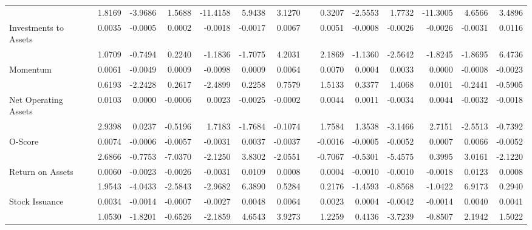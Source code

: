 \begin{sidewaystable}[htbp]
{\begin{tabular}{lrrrrrrrrrrrrr}
& 1.8169 & -3.9686 & 1.5688 & -11.4158 & 5.9438 & 3.1270 &       & 0.3207 & -2.5553 & 1.7732 & -11.3005 & 4.6566 & 3.4896 \\
Investments to Assets & 0.0035 & -0.0005 & 0.0002 & -0.0018 & -0.0017 & 0.0067 &       & 0.0051 & -0.0008 & -0.0026 & -0.0026 & -0.0031 & 0.0116 \\
& 1.0709 & -0.7494 & 0.2240 & -1.1836 & -1.7075 & 4.2031 &       & 2.1869 & -1.1360 & -2.5642 & -1.8245 & -1.8695 & 6.4736 \\
Momentum & 0.0061 & -0.0049 & 0.0009 & -0.0098 & 0.0009 & 0.0064 &       & 0.0070 & 0.0004 & 0.0033 & 0.0000 & -0.0008 & -0.0023 \\
& 0.6193 & -2.2428 & 0.2617 & -2.4899 & 0.2258 & 0.7579 &       & 1.5133 & 0.3377 & 1.4068 & 0.0101 & -0.2441 & -0.5905 \\
Net Operating Assets & 0.0103 & 0.0000 & -0.0006 & 0.0023 & -0.0025 & -0.0002 &       & 0.0044 & 0.0011 & -0.0034 & 0.0044 & -0.0032 & -0.0018 \\
& 2.9398 & 0.0237 & -0.5196 & 1.7183 & -1.7684 & -0.1074 &       & 1.7584 & 1.3538 & -3.1466 & 2.7151 & -2.5513 & -0.7392 \\
O-Score & 0.0074 & -0.0006 & -0.0057 & -0.0031 & 0.0037 & -0.0037 &       & -0.0016 & -0.0005 & -0.0052 & 0.0007 & 0.0066 & -0.0052 \\
& 2.6866 & -0.7753 & -7.0370 & -2.1250 & 3.8302 & -2.0551 &       & -0.7067 & -0.5301 & -5.4575 & 0.3995 & 3.0161 & -2.1220 \\
Return on Assets & 0.0060 & -0.0023 & -0.0026 & -0.0031 & 0.0109 & 0.0008 &       & 0.0004 & -0.0010 & -0.0010 & -0.0018 & 0.0123 & 0.0008 \\
& 1.9543 & -4.0433 & -2.5843 & -2.9682 & 6.3890 & 0.5284 &       & 0.2176 & -1.4593 & -0.8568 & -1.0422 & 6.9173 & 0.2940 \\
Stock Issuance & 0.0034 & -0.0014 & -0.0007 & -0.0027 & 0.0048 & 0.0064 &       & 0.0023 & 0.0004 & -0.0042 & -0.0014 & 0.0040 & 0.0041 \\
& 1.0530 & -1.8201 & -0.6526 & -2.1859 & 4.6543 & 3.9273 &       & 1.2259 & 0.4136 & -3.7239 & -0.8507 & 2.1942 & 1.5022 \\
\bottomrule
\end{tabular}%
}
\label{tab:vol-ff5}%
\end{sidewaystable}%

